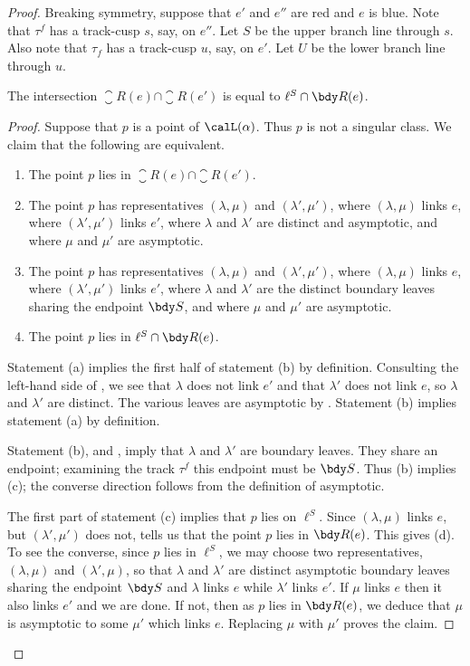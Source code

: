 \documentclass[12pt]{amsart}
\begin{document}
\begin{proof}
Breaking symmetry, suppose that $e'$ and $e''$ are red and $e$ is blue.  Note that $\tau^f$ has a track-cusp $s$, say, on $e''$.  Let $S$ be the upper branch line through $s$. Also note that $\tau_f$ has a track-cusp $u$, say, on $e'$. Let $U$ be the lower branch line through $u$. 

\begin{claim*}
The intersection $\closure{R}(e) \cap \closure{R}(e')$ is equal to $\ell^S \cap \bdy R(e)$. 
\end{claim*}

\begin{proof} 
Suppose that $p$ is a point of $\calL(\alpha)$.  Thus $p$ is not a singular class.  We claim that the following are equivalent.  
\begin{enumerate}[label=(\alph*)]
\item The point $p$ lies in $\closure{R}(e) \cap \closure{R}(e')$.
\item The point $p$ has representatives $(\lambda,\mu)$ and $(\lambda',\mu')$, where $(\lambda,\mu)$ links $e$, where $(\lambda',\mu')$ links $e'$, where $\lambda$ and $\lambda'$ are distinct and asymptotic, and where $\mu$ and $\mu'$ are asymptotic.
\item The point $p$ has representatives $(\lambda,\mu)$ and $(\lambda',\mu')$, where $(\lambda,\mu)$ links $e$, where $(\lambda',\mu')$ links $e'$, where $\lambda$ and $\lambda'$ are the distinct boundary leaves sharing the endpoint $\bdy S$, and where $\mu$ and $\mu'$ are asymptotic.
\item The point $p$ lies in $\ell^S \cap \bdy R(e)$.
\end{enumerate}

Statement (a) implies the first half of statement (b) by definition.  Consulting the left-hand side of , we see that $\lambda$ does not link $e'$ and that $\lambda'$ does not link $e$, so $\lambda$ and $\lambda'$ are distinct.  The various leaves are asymptotic by .  Statement (b) implies statement (a) by definition.

Statement (b), and , imply that $\lambda$ and $\lambda'$ are boundary leaves.  They share an endpoint; examining the track $\tau^f$ this endpoint must be $\bdy S$.  Thus (b) implies (c); the converse direction follows from the definition of asymptotic.

The first part of statement (c) implies that $p$ lies on $\ell^S$. Since $(\lambda,\mu)$ links $e$, but $(\lambda',\mu')$ does not,  tells us that the point $p$ lies in $\bdy R(e)$. This gives (d).  To see the converse, since $p$ lies in $\ell^S$, we may choose two representatives, $(\lambda,\mu)$ and $(\lambda',\mu)$, so that $\lambda$ and $\lambda'$ are distinct asymptotic boundary leaves sharing the endpoint $\bdy S$ and $\lambda$ links $e$ while $\lambda'$ links $e'$.  If $\mu$ links $e$ then it also links $e'$ and we are done. If not, then as $p$ lies in $\bdy R(e)$, we deduce that $\mu$ is asymptotic to some $\mu'$ which links $e$.  Replacing $\mu$ with $\mu'$ proves the claim.
\end{proof}


\end{proof}
\end{document}
